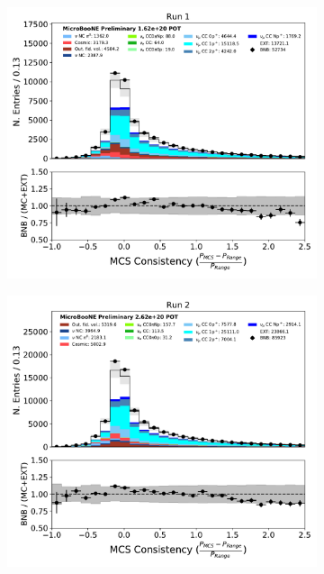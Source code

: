 \begin{figure}[hbt!] 
\begin{center}
    \begin{subfigure}[b]{0.35\textwidth}
        \centering
        \includegraphics[width=1.00\textwidth]{NuMuCCsel/Images/Ryan/Run1/trk_p_quality_v_08052020_presel_samples_longest_noCRT_event_category.pdf}
    \end{subfigure}
    \begin{subfigure}[b]{0.35\textwidth}
        \centering
        \includegraphics[width=1.00\textwidth]{NuMuCCsel/Images/Ryan/Run2/trk_p_quality_v_08052020_presel_samples_longest_noCRT_event_category.pdf}

\end{subfigure}
\end{center}
\end{figure}

